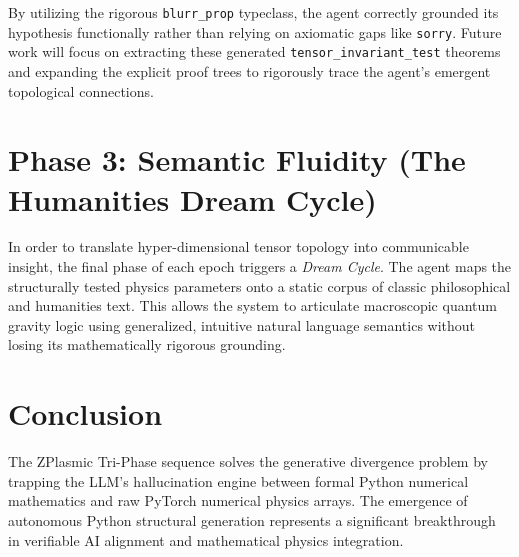 By utilizing the rigorous \texttt{blurr\_prop} typeclass, the agent correctly grounded its hypothesis functionally rather than relying on axiomatic gaps like \texttt{sorry}. Future work will focus on extracting these generated \texttt{tensor\_invariant\_test} theorems and expanding the explicit proof trees to rigorously trace the agent's emergent topological connections.

\section{Phase 3: Semantic Fluidity (The Humanities Dream Cycle)}
In order to translate hyper-dimensional tensor topology into communicable insight, the final phase of each epoch triggers a \textit{Dream Cycle}. The agent maps the structurally tested physics parameters onto a static corpus of classic philosophical and humanities text. This allows the system to articulate macroscopic quantum gravity logic using generalized, intuitive natural language semantics without losing its mathematically rigorous grounding.

\section{Conclusion}
The ZPlasmic Tri-Phase sequence solves the generative divergence problem by trapping the LLM's hallucination engine between formal Python numerical mathematics and raw PyTorch numerical physics arrays. The emergence of autonomous Python structural generation represents a significant breakthrough in verifiable AI alignment and mathematical physics integration.
